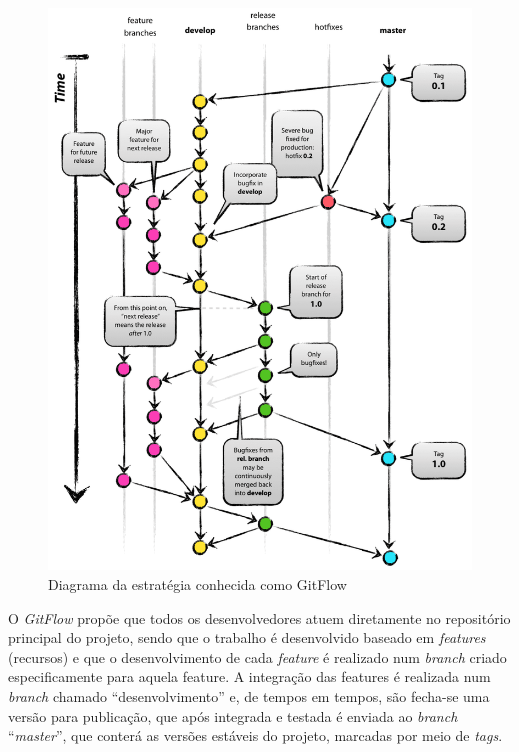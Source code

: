     \begin{figure}[htb]%
        \begin{center}
            \includegraphics[scale=0.23]{./imagens/gitflow.png}%
        \end{center}%
        \caption{Diagrama da estratégia conhecida como GitFlow \label{fig:gitflow}}%
    \end{figure}%
    
O \textit{GitFlow} propõe que todos os desenvolvedores atuem diretamente no repositório principal do projeto, sendo que o trabalho é desenvolvido baseado em \textit{features} (recursos) e que o desenvolvimento de cada \textit{feature} é realizado num \textit{branch} criado especificamente para aquela feature. A integração das features é realizada num \textit{branch} chamado ``desenvolvimento'' e, de tempos em tempos, são fecha-se uma versão para publicação, que após integrada e testada é enviada ao \textit{branch} ``\textit{master}'', que conterá as versões estáveis do projeto, marcadas por meio de \textit{tags}.

